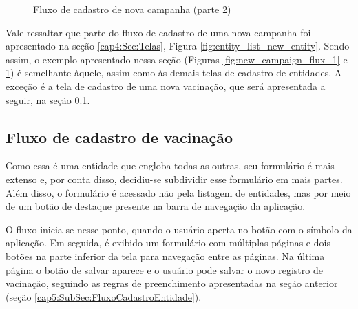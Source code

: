 \begin{figure}[ht!]
    \caption[Fluxo de cadastro de nova campanha (parte 2)]{Fluxo de cadastro de nova campanha (parte 2)}
  
  \label{fig:new_campaign_flux_2}
\end{figure}

Vale ressaltar que parte do fluxo de cadastro de uma nova campanha foi apresentado na seção \ref{cap4:Sec:Telas}, Figura \ref{fig:entity_list_new_entity}. Sendo assim, o exemplo apresentado nessa seção (Figuras \ref{fig:new_campaign_flux_1} e \ref{fig:new_campaign_flux_2}) é semelhante àquele, assim como às demais telas de cadastro de entidades. A exceção é a tela de cadastro de uma nova vacinação, que será apresentada a seguir, na seção \ref{cap5:SubSec:FluxoCadastroVacinacao}.

\subsection{Fluxo de cadastro de vacinação}
\label{cap5:SubSec:FluxoCadastroVacinacao}
Como essa é uma entidade que engloba todas as outras, seu formulário é mais extenso e, por conta disso, decidiu-se subdividir esse formulário em mais partes. Além disso, o formulário é acessado não pela listagem de entidades, mas por meio de um botão de destaque presente na barra de navegação da aplicação.

O fluxo inicia-se nesse ponto, quando o usuário aperta no botão com o símbolo da aplicação. Em seguida, é exibido um formulário com múltiplas páginas e dois botões na parte inferior da tela para navegação entre as páginas. Na última página o botão de salvar aparece e o usuário pode salvar o novo registro de vacinação, seguindo as regras de preenchimento apresentadas na seção anterior (seção \ref{cap5:SubSec:FluxoCadastroEntidade}).

